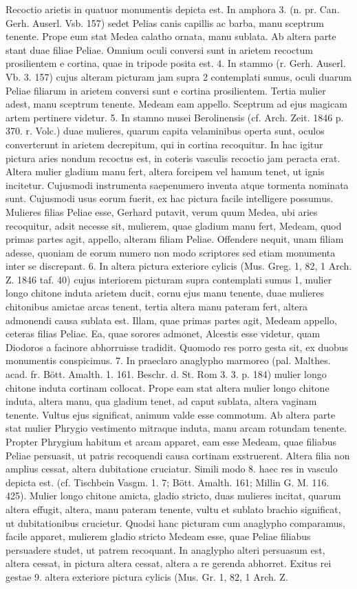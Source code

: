 \documentclass[landscape, a4paper, 11pt, oneside, polutonikogreek, german]{article}
\begin{document}
Recoctio arietis in quatuor monumentis depicta est. In amphora 3. (n. pr. Can. Gerh. Auserl. Vsb. 157) sedet Pelias canis capillis ac barba, manu sceptrum tenente. Prope eum stat Medea calatho ornata, manu sublata. Ab altera parte stant duae filiae Peliae. Omnium oculi conversi sunt in arietem recoctum prosilientem e cortina, quae in tripode posita est. 4. In stammo (r. Gerh. Auserl. Vb. 3. 157) cujus alteram picturam jam supra 2 contemplati sumus, oculi duarum Peliae filiarum in arietem conversi sunt e cortina prosilientem. Tertia mulier adest, manu sceptrum tenente. Medeam eam appello. Sceptrum ad ejus magicam artem pertinere videtur. 5. In stamno musei Berolinensis (cf. Arch. Zeit. 1846 p. 370. r. Volc.) duae mulieres, quarum capita velaminibus operta sunt, oculos converterunt in arietem decrepitum, qui in cortina recoquitur. In hac igitur pictura aries nondum recoctus est, in coteris vasculis recoctio jam peracta erat. Altera mulier gladium manu fert, altera forcipem vel hamum tenet, ut ignis incitetur. Cujusmodi instrumenta saepenumero inventa atque tormenta nominata sunt. Cujusmodi usus eorum fuerit, ex hac pictura facile intelligere possumus. Mulieres filias Peliae esse, Gerhard putavit, verum quum Medea, ubi aries recoquitur, adsit necesse sit, mulierem, quae gladium manu fert, Medeam, quod primas partes agit, appello, alteram filiam Peliae. Offendere nequit, unam filiam adesse, quoniam de eorum numero non modo scriptores sed etiam monumenta inter se discrepant. 6. In altera pictura exteriore cylicis (Mus. Greg. 1, 82, 1 Arch. Z. 1846 taf. 40) cujus interiorem picturam supra contemplati sumus 1, mulier longo chitone induta arietem ducit, cornu ejus manu tenente, duae mulieres chitonibus amictae arcas tenent, tertia altera manu pateram fert, altera admonendi causa sublata est. Illam, quae primas partes agit, Medeam appello, ceteras filias Peliae. Ea, quae sorores admonet, Alcestis esse videtur, quam Diodoros a facinore abhorruisse tradidit. Quomodo res porro gesta sit, ex duobus monumentis conspicimus. 7. In praeclaro anaglypho marmoreo (pal. Malthes. acad. fr. Bött. Amalth. 1. 161. Beschr. d. St. Rom 3. 3. p. 184) mulier longo chitone induta cortinam collocat. Prope eam stat altera mulier longo chitone induta, altera manu, qua gladium tenet, ad caput sublata, altera vaginam tenente. Vultus ejus significat, animum valde esse commotum. Ab altera parte stat mulier Phrygio vestimento mitraque induta, manu arcam rotundam tenente. Propter Phrygium habitum et arcam apparet, eam esse Medeam, quae filiabus Peliae persuasit, ut patris recoquendi causa cortinam exstruerent. Altera filia non amplius cessat, altera dubitatione cruciatur. Simili modo 8. haec res in vasculo depicta est. (cf. Tischbein Vasgm. 1. 7; Bött. Amalth. 161; Millin G. M. 116. 425). Mulier longo chitone amicta, gladio stricto, duas mulieres incitat, quarum altera effugit, altera, manu pateram tenente, vultu et sublato brachio significat, ut dubitationibus crucietur. Quodsi hanc picturam cum anaglypho comparamus, facile apparet, mulierem gladio stricto Medeam esse, quae Peliae filiabus persuadere studet, ut patrem recoquant. In anaglypho alteri persuasum est, altera cessat, in pictura altera cessat, altera a re gerenda abhorret. Exitus rei gestae 9. altera exteriore pictura cylicis (Mus. Gr. 1, 82, 1 Arch. Z. 
\end{document}
